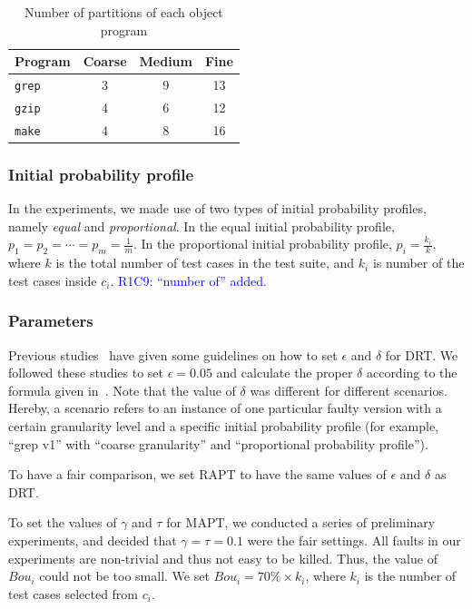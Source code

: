 \documentclass[10pt,journal,compsoc]{IEEEtran}
\begin{document}


\begin{table}
\caption{Number of partitions of each object program}
\label{tab:gra}
\centering
\begin{tabular}{|l|c|c|c|} \hline
Program				& Coarse	& Medium	& Fine	\\ \hline
\texttt{grep}	& 3				& 9				& 13		\\ \hline
\texttt{gzip}	& 4				& 6				& 12		\\ \hline
\texttt{make}	& 4				& 8				& 16		\\ \hline
\end{tabular}
\end{table}

\subsubsection{Initial probability profile}
In the experiments, we made use of two types of initial probability profiles, namely \textit{equal} and \textit{proportional}. In the equal initial probability profile, $p_1 = p_2 = \cdots = p_m = \displaystyle\frac{1}{m}$. In the proportional initial probability profile, $p_i = \displaystyle\frac{k_i}{k}$, where $k$ is the total number of test cases in the test suite, and $k_i$ is number of the test cases inside $c_i$.  \textcolor{blue}{R1C9: ``number of'' added.}

\subsubsection{Parameters}
Previous studies~\cite{Lv11, Yang14, Li15} have given some guidelines on how to set $\epsilon$ and $\delta$ for DRT. We followed these studies to set $\epsilon = 0.05$ and calculate the proper $\delta$ according to the formula given in~\cite{Li15}. Note that the value of $\delta$ was different for different scenarios. Hereby, a scenario refers to an instance of one particular faulty version with a certain granularity level and a specific initial probability profile (for example, ``grep v1'' with ``coarse granularity'' and ``proportional probability profile'').

To have a fair comparison, we set RAPT to have the same values of $\epsilon$ and $\delta$ as DRT.

To set the values of $\gamma$ and $\tau$ for MAPT, we conducted a series of preliminary experiments, and decided that $\gamma = \tau = 0.1$ were the fair settings. All faults in our experiments are non-trivial and thus not easy to be killed. Thus, the value of $Bou_i$ could not be too small. We set $Bou_i = 70\% \times k_i$, where $k_i$ is the number of test cases selected from $c_i$.
\end{document}
